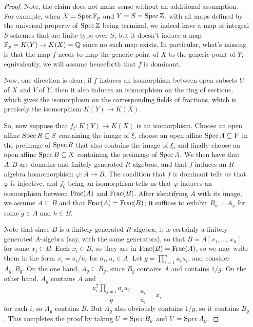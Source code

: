 \begin{proof}
	Note, the claim does not make sense without an additional assumption. For example, when $X = \operatorname{Spec}\mathbb{F}_p$ and $Y = S = \operatorname{Spec}\mathbb{Z}$, with all maps defined by the universal property of $\operatorname{Spec}\mathbb{Z}$ being terminal, we indeed have a map of integral $S$-schemes that are finite-type over $S$, but it doesn't induce a map $\mathbb{F}_p = K(Y) \to K(X) = \mathbb{Q}$ since no such map exists. In particular, what's missing is that the map $f$ needs to map the generic point of $X$ to the generic point of $Y$; equivalently, we will assume henceforth that $f$ is dominant.
	
	Now, one direction is clear; if $f$ induces an isomorphism between open subsets $U$ of $X$ and $V$ of $Y$, then it also induces an isomorphism on the ring of sections, which gives the isomorphism on the corresponding fields of fractions, which is precisely the isomorphism $K(Y) \to K(X)$.
	
	So, now suppose that $f_\xi : K(Y) \to K(X)$ is an isomorphism. Choose an open affine $\operatorname{Spec} R \subseteq S$ containing the image of $\xi$, choose an open affine $\operatorname{Spec} A \subseteq Y$ in the preimage of $\operatorname{Spec} R$ that also contains the image of $\xi$, and finally choose an open affine $\operatorname{Spec} B \subseteq X$ containing the preimage of $\operatorname{Spec} A$. We then have that $A,B$ are domains and finitely generated $R$-algebras, and that $f$ induces an $R$-algebra homomorphism $\varphi : A \to B$. The condition that $f$ is dominant tells us that $\varphi$ is injective, and $f_\xi$ being an isomorphism tells us that $\varphi$ induces an isomorphism between $\operatorname{Frac}(A)$ and $\operatorname{Frac}(B)$. After identifying $A$ with its image, we assume $A \subseteq B$ and that $\operatorname{Frac}(A)=\operatorname{Frac}(B)$; it suffices to exhibit $B_h = A_g$ for some $g \in A$ and $h \in B$.
	
	Note that since $B$ is a finitely generated $R$-algebra, it is certainly a finitely generated $A$-algebra (say, with the same generators), so that $B = A[x_1,\ldots,x_n]$ for some $x_i \in B$. Each $x_i \in B$, so they are in $\operatorname{Frac}(B) = \operatorname{Frac}(A)$, so we may write them in the form $x_i = a_i/u_i$ for $a_i,u_i \in A$. Let $g = \prod_{i=1}^n a_iu_i$, and consider $A_g,B_g$. On the one hand, $A_g \subseteq B_g$, since $B_g$ contains $A$ and contains $1/g$. On the other hand, $A_g$ contains $A$ and
	\[ \frac{a_i^2\prod_{j \neq i} a_ju_j}{g} = \frac{a_i}{u_i} = x_i \]
	for each $i$, so $A_g$ contains $B$. But $A_g$ also obviously contains $1/g$, so it contains $B_g$. This completes the proof by taking $U = \operatorname{Spec} B_g$ and $V = \operatorname{Spec} A_g$.
\end{proof}
